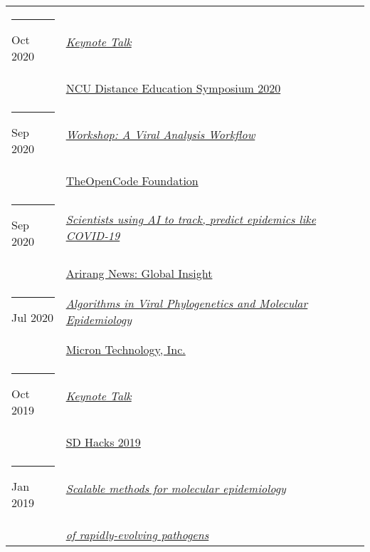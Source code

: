 \documentclass[margin,line]{res}
\begin{document}
\begin{resume}
\begin{longtable}{@{}p{0.7in}p{4in}}
\hspace*{-4mm} \rule{-1mm}{5mm} Oct 2020 & \href{http://distance.ncu.edu.jm/proposal_submission}{\textit{Keynote Talk}}\\*
\hspace*{-4mm} & \hspace{4mm} \href{http://distance.ncu.edu.jm/proposal_submission}{NCU Distance Education Symposium 2020}\\
\hspace*{-4mm} \rule{-1mm}{5mm} Sep 2020 & \href{https://www.theopencode.org/a-viral-analysis-workflow/}{\textit{Workshop: A Viral Analysis Workflow}}\\*
\hspace*{-4mm} & \hspace{4mm} \href{https://www.theopencode.org/}{TheOpenCode Foundation}\\
\hspace*{-4mm} \rule{-1mm}{5mm} Sep 2020 & \href{https://youtu.be/xHSFWtLL8bc}{\textit{Scientists using AI to track, predict epidemics like COVID-19}}\\*
\hspace*{-4mm} & \hspace{4mm} \href{https://www.arirang.com/}{Arirang News: Global Insight}\\
\hspace*{-4mm} \rule{-1mm}{5mm} Jul 2020 & \href{https://www.micron.com/}{\textit{Algorithms in Viral Phylogenetics and Molecular Epidemiology}}\\*
\hspace*{-4mm} & \hspace{4mm} \href{https://www.micron.com/}{Micron Technology, Inc.}\\
\hspace*{-4mm} \rule{-1mm}{5mm} Oct 2019 & \href{https://www.sdhacks.io/}{\textit{Keynote Talk}}\\*
\hspace*{-4mm} & \hspace{4mm} \href{https://www.sdhacks.io/}{SD Hacks 2019}\\
\hspace*{-4mm} \rule{-1mm}{5mm} Jan 2019 & \href{https://cse.ucsd.edu/about/scalable-methods-molecular-epidemiology-rapidly-evolving-pathogens}{\textit{Scalable methods for molecular epidemiology}}\\*
\hspace*{-4mm} & \hspace{4mm} \href{https://cse.ucsd.edu/about/scalable-methods-molecular-epidemiology-rapidly-evolving-pathogens}{\textit{of rapidly-evolving pathogens}}\\*

\end{longtable}
\end{resume}
\end{document}
